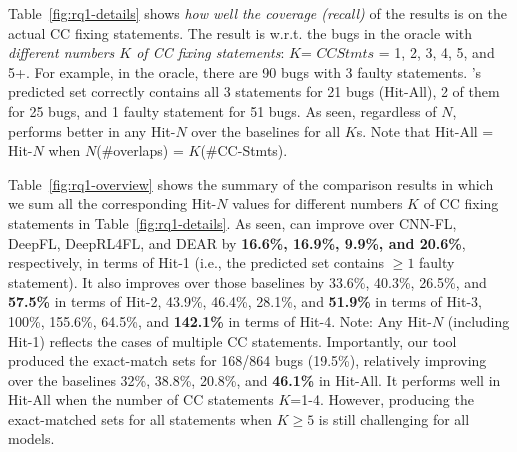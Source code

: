 Table~\ref{fig:rq1-details} shows {\em how well the coverage (recall)} of
the results is on the actual CC fixing statements. The result is
w.r.t. the bugs in the oracle with {\em different numbers $K$ of CC
fixing statements}: $K$= $CCStmts$ = 1, 2, 3, 4, 5, and 5+. For
example, in the oracle, there are 90 bugs with 3 faulty
statements. {\tool}'s predicted set correctly contains all 3
statements for 21 bugs (Hit-All), 2 of them for 25 bugs, and 1 faulty
statement for 51 bugs. As seen, regardless of $N$, {\tool} performs
better in any Hit-$N$ over the baselines for all $K$s. Note that
Hit-All = Hit-$N$ when $N$(\#overlaps) = $K$(\#CC-Stmts).



Table~\ref{fig:rq1-overview} shows the summary of the comparison
results in which we sum all the corresponding Hit-$N$ values for
different numbers $K$ of CC fixing statements in
Table~\ref{fig:rq1-details}.
%
As seen, {\tool} can improve over CNN-FL, DeepFL, DeepRL4FL, and DEAR
by {\bf 16.6\%, 16.9\%, 9.9\%, and 20.6\%}, respectively, in terms of
Hit-1 (i.e., the predicted set contains $\geq 1$ faulty statement).
%
%
It also improves over those baselines by 33.6\%, 40.3\%, 26.5\%,
and {\bf 57.5\%} in terms of Hit-2, 43.9\%, 46.4\%, 28.1\%, and {\bf
51.9\%} in terms of Hit-3, 100\%, 155.6\%, 64.5\%, and {\bf 142.1\%} in
terms of Hit-4. Note: Any Hit-$N$ (including Hit-1) reflects
the cases of multiple CC statements.
%
Importantly, our tool produced the exact-match sets for 168/864 bugs
(19.5\%), relatively improving over the baselines 32\%, 38.8\%,
20.8\%, and {\bf 46.1\%} in Hit-All. It performs well in Hit-All
when the number of CC statements $K$=1-4. However, producing the
exact-matched sets for all statements when $K \geq 5$ is still
challenging for all models.


